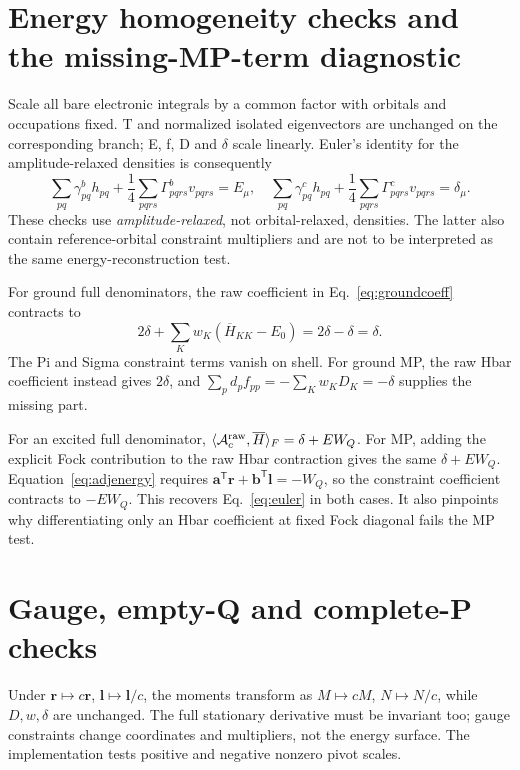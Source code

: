 \documentclass[11pt,letterpaper]{article}
\numberwithin{equation}{section}
\newcommand{\bH}{\overline H}
\newcommand{\T}{\mathsf T}
\begin{document}
\section{Energy homogeneity checks and the missing-MP-term diagnostic}
Scale all bare electronic integrals by a common factor with orbitals and
occupations fixed. T and normalized isolated eigenvectors are unchanged
on the corresponding branch; E, f, D and $\delta$ scale linearly. Euler's
identity for the amplitude-relaxed densities is consequently
\begin{equation}
 \sum_{pq}\gamma^b_{pq}h_{pq}+\frac14\sum_{pqrs}\Gamma^b_{pqrs}v_{pqrs}=E_\mu,
 \quad
 \sum_{pq}\gamma^c_{pq}h_{pq}+\frac14\sum_{pqrs}\Gamma^c_{pqrs}v_{pqrs}=\delta_\mu.
 \label{eq:euler}
\end{equation}
These checks use \emph{amplitude-relaxed}, not orbital-relaxed, densities.
The latter also contain reference-orbital constraint multipliers and are
not to be interpreted as the same energy-reconstruction test.

For ground full denominators, the raw coefficient in
Eq.~\eqref{eq:groundcoeff} contracts to
\begin{equation}
 2\delta+\sum_Kw_K(\bH_{KK}-E_0)=2\delta-\delta=\delta.
\end{equation}
The Pi and Sigma constraint terms vanish on shell. For ground MP, the raw
Hbar coefficient instead gives $2\delta$, and
$\sum_p d_pf_{pp}=-\sum_Kw_KD_K=-\delta$ supplies the missing part.

For an excited full denominator,
$\langle\mathcal A_c^{\rm raw},\bH\rangle_F=\delta+EW_Q$.
For MP, adding the explicit Fock contribution to the raw Hbar contraction
gives the same $\delta+EW_Q$. Equation~\eqref{eq:adjenergy} requires
$\bm a^{\T}\bm r+\bm b^{\T}\bm l=-W_Q$, so the constraint coefficient
contracts to $-EW_Q$. This recovers Eq.~\eqref{eq:euler} in both cases.
It also pinpoints why differentiating only an Hbar coefficient at fixed
Fock diagonal fails the MP test.

\section{Gauge, empty-Q and complete-P checks}
Under $\bm r\mapsto c\bm r$, $\bm l\mapsto\bm l/c$, the moments transform
as $M\mapsto cM$, $N\mapsto N/c$, while $D,w,\delta$ are unchanged. The
full stationary derivative must be invariant too; gauge constraints change
coordinates and multipliers, not the energy surface. The implementation
tests positive and negative nonzero pivot scales.
\end{document}

